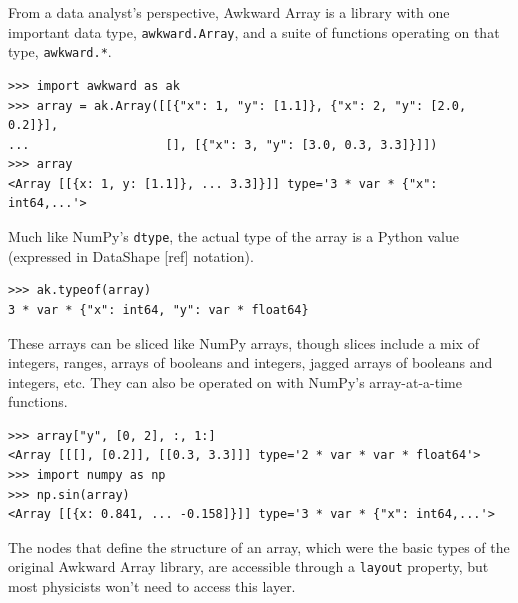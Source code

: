 \documentclass{webofc}
\begin{document}
From a data analyst's perspective, Awkward Array is a library with one important data type, \texttt{awkward.Array}, and a suite of functions operating on that type, \texttt{awkward.*}.

\begin{verbatim}
>>> import awkward as ak
>>> array = ak.Array([[{"x": 1, "y": [1.1]}, {"x": 2, "y": [2.0, 0.2]}],
...                   [], [{"x": 3, "y": [3.0, 0.3, 3.3]}]])
>>> array
<Array [[{x: 1, y: [1.1]}, ... 3.3]}]] type='3 * var * {"x": int64,...'>
\end{verbatim}

\noindent Much like NumPy's \texttt{dtype}, the actual type of the array is a Python value (expressed in DataShape [ref] notation).

\begin{verbatim}
>>> ak.typeof(array)
3 * var * {"x": int64, "y": var * float64}
\end{verbatim}

\noindent These arrays can be sliced like NumPy arrays, though slices include a mix of integers, ranges, arrays of booleans and integers, jagged arrays of booleans and integers, etc. They can also be operated on with NumPy's array-at-a-time functions.

\begin{verbatim}
>>> array["y", [0, 2], :, 1:]
<Array [[[], [0.2]], [[0.3, 3.3]]] type='2 * var * var * float64'>
>>> import numpy as np
>>> np.sin(array)
<Array [[{x: 0.841, ... -0.158]}]] type='3 * var * {"x": int64,...'>
\end{verbatim}

The nodes that define the structure of an array, which were the basic types of the original Awkward Array library, are accessible through a \texttt{layout} property, but most physicists won't need to access this layer.

\end{document}
